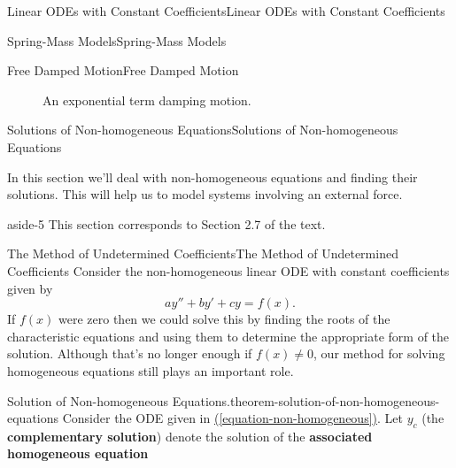 \documentclass[10pt,]{book}
\newcommand{\terminology}[1]{\textbf{#1}}
\numberwithin{equation}{section}
\begin{document}
\begin{chapterptx}{Linear ODEs with Constant Coefficients}{}{Linear ODEs with Constant Coefficients}{}{}
\begin{sectionptx}{Spring-Mass Models}{}{Spring-Mass Models}{}{}
\begin{subsectionptx}{Free Damped Motion}{}{Free Damped Motion}{}{}
\begin{figure}
{
}
\caption{An exponential term damping motion.\label{figure-damped-motion}}
\end{figure}
\end{subsectionptx}
\end{sectionptx}
%
%
\typeout{************************************************}
\typeout{************************************************}
%
\begin{sectionptx}{Solutions of Non-homogeneous Equations}{}{Solutions of Non-homogeneous Equations}{}{}\label{section-solutions-of-nonhomogeneous-equations}
\begin{introduction}{}%
\hypertarget{p-222}{}%
In this section we'll deal with non-homogeneous equations and finding their solutions. This will help us to model systems involving an external force.%
\begin{aside}{}{aside-5}%
\hypertarget{p-223}{}%
This section corresponds to Section 2.7 of the text.%
\end{aside}
\end{introduction}%
%
%
\typeout{************************************************}
\typeout{************************************************}
%
\begin{subsectionptx}{The Method of Undetermined Coefficients}{}{The Method of Undetermined Coefficients}{}{}\label{subsection-the-method-of-undetermined-coefficients}
\hypertarget{p-224}{}%
Consider the non-homogeneous linear ODE with constant coefficients given by%
\begin{equation}
ay'' + by' + cy = f(x).\label{equation-non-homogeneous}
\end{equation}
If \(f(x)\) were zero then we could solve this by finding the roots of the characteristic equations and using them to determine the appropriate form of the solution. Although that's no longer enough if \(f(x)\neq0\), our method for solving homogeneous equations still plays an important role.%
\begin{theorem}{Solution of Non-homogeneous Equations.}{}{theorem-solution-of-non-homogeneous-equations}%
\hypertarget{p-225}{}%
Consider the ODE given in \hyperref[equation-non-homogeneous]{(\ref{equation-non-homogeneous})}. Let \(y_{c}\) (the \terminology{complementary solution}) denote the solution of the \terminology{associated homogeneous equation}%

\end{theorem}
\end{subsectionptx}
\end{sectionptx}
\end{chapterptx}
\end{document}
